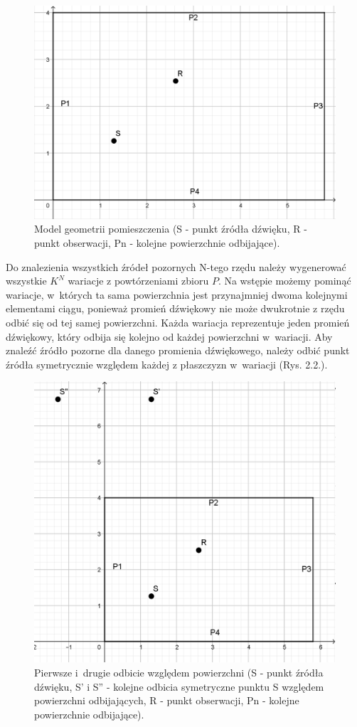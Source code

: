 \begin{figure}[H]
        \centering
                \centering
                \includegraphics[width=12cm]{rys1}
	\caption{Model geometrii pomieszczenia (S - punkt źródła dźwięku, R - punkt obserwacji, Pn - kolejne powierzchnie odbijające).}
\end{figure}

Do znalezienia wszystkich źródeł pozornych N-tego rzędu należy wygenerować wszystkie $K^N$ wariacje z powtórzeniami zbioru $P$. Na wstępie możemy pominąć wariacje, w~których ta sama powierzchnia jest przynajmniej dwoma kolejnymi elementami ciągu, ponieważ promień dźwiękowy nie może dwukrotnie z rzędu odbić się od tej samej powierzchni. Każda wariacja reprezentuje jeden promień dźwiękowy, który odbija się kolejno od każdej powierzchni w~wariacji. Aby znaleźć źródło pozorne dla danego promienia dźwiękowego, należy odbić punkt źródła symetrycznie względem każdej z płaszczyzn w~wariacji (Rys. 2.2.). 

\begin{figure}[H]
        \centering
                \centering
                \includegraphics[width=12cm]{rys2}
	\caption{Pierwsze i~drugie odbicie względem powierzchni  (S - punkt źródła dźwięku, S' i S'' - kolejne odbicia symetryczne punktu S względem powierzchni odbijających, R - punkt obserwacji, Pn - kolejne powierzchnie odbijające).}
\end{figure}

